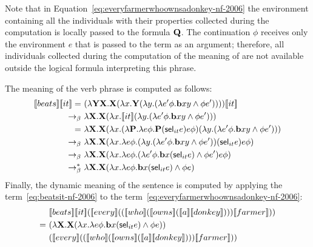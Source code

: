 \begin{example}
Note that in Equation~\eqref{eq:everyfarmerwhoownsadonkey-nf-2006} the environment containing all the individuals with their properties collected during the computation is locally passed to the formula $\Q2$. The continuation $\phi$ receives only the environment $e$ that is passed to the term as an argument; therefore, all individuals collected during the computation of the meaning of  are not available outside the logical formula interpreting this phrase.

The meaning of the verb phrase  is computed as follows:
\begin{align}
 \trr{\I{beats}}  \trr{\I{it}}  
 = \ &  (\lambda \Y2 \X2. \X2 ( \lambda \x1. \Y2 (\lambda \y1. ( \lambda e' \phi. \cbeat \x1 \y1 \land \phi e')))) \trr{\I{it}}   \notag \\
 \bconv \ & \lambda  \X2. \X2 ( \lambda \x1. \trr{\I{it}}  (\lambda \y1. ( \lambda e' \phi. \cbeat \x1 \y1 \land \phi e')))   \notag \\
 = \ & \lambda  \X2. \X2 ( \lambda \x1. (  \lambda \P2. \lambda e \phi. \P2 ( \selK_{it} e) e \phi )  (\lambda \y1. ( \lambda e' \phi. \cbeat \x1 \y1 \land \phi e')))   \notag \\
 \bconv \ & \lambda  \X2. \X2 ( \lambda \x1. \lambda e \phi. (\lambda \y1. ( \lambda e' \phi. \cbeat \x1 \y1 \land \phi e')) ( \selK_{it} e) e \phi )    \notag \\
 \bconv \ &  \lambda  \X2. \X2 ( \lambda \x1. \lambda e \phi.  ( \lambda e' \phi. \cbeat \x1  ( \selK_{it} e)  \land \phi e') e \phi )    \notag \\
  \bred \ &  \lambda  \X2. \X2 ( \lambda \x1. \lambda e \phi.   \cbeat \x1  ( \selK_{it} e)  \land \phi e )  \label{eq:beatsit-nf-2006}
\end{align}
Finally, the dynamic meaning of the sentence is computed by applying the \\ term~\eqref{eq:beatsit-nf-2006} to the term~\eqref{eq:everyfarmerwhoownsadonkey-nf-2006}:
\begin{align}
& \trr{\I{beats}}  \trr{\I{it}} (\trr{\I{every}}  ((\trr{\I{who}}  (\trr{\I{owns}}  (\trr{\I{a}}  \trr{\I{donkey}} ) ) ) \trr{\I{farmer}}  )) \notag \\
= \ & ( \lambda  \X2. \X2 ( \lambda \x1. \lambda e \phi.   \cbeat \x1  ( \selK_{it} e)  \land \phi e )) \notag \\
&  (\trr{\I{every}}  ((\trr{\I{who}}  (\trr{\I{owns}}  (\trr{\I{a}}  \trr{\I{donkey}} ) ) ) \trr{\I{farmer}}  )) \notag \\

\end{align}
\end{example}
